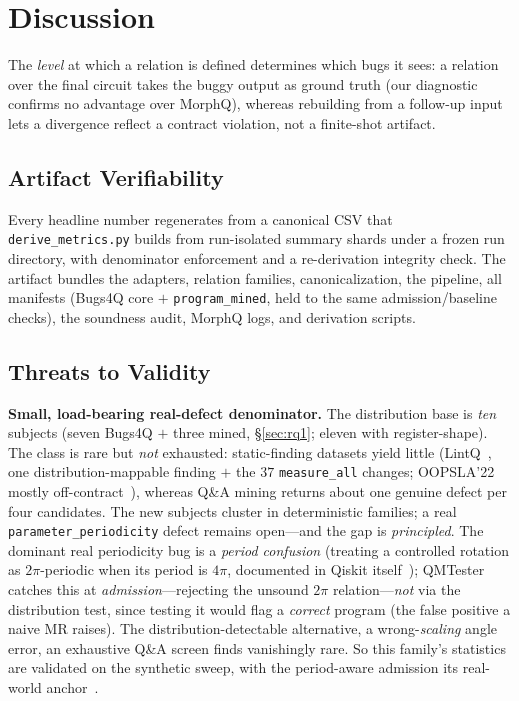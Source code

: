 \section{Discussion}
\label{sec:discussion}

The \emph{level} at which a relation is defined determines which bugs it sees: a relation over the final circuit takes the buggy output as ground truth (our diagnostic confirms no advantage over MorphQ), whereas rebuilding from a follow-up input lets a divergence reflect a contract violation, not a finite-shot artifact.

\subsection{Artifact Verifiability}
\label{sec:artifact-verifiability}

Every headline number regenerates from a canonical CSV that \texttt{derive\_metrics.py} builds from run-isolated summary shards under a frozen run directory, with denominator enforcement and a re-derivation integrity check. The artifact bundles the adapters, relation families, canonicalization, the pipeline, all manifests (Bugs4Q core $+$ \texttt{program\_mined}, held to the same admission/baseline checks), the soundness audit, MorphQ logs, and derivation scripts.

\subsection{Threats to Validity}
\label{sec:threats}

\textbf{Small, load-bearing real-defect denominator.} The distribution base is \emph{ten} subjects (seven Bugs4Q $+$ three mined, \S\ref{sec:rq1}; eleven with register-shape). The class is rare but \emph{not} exhausted: static-finding datasets yield little (LintQ~\cite{paltenghi2024lintq}, one distribution-mappable finding $+$ the $37$ \texttt{measure\_all} changes; OOPSLA'22 mostly off-contract~\cite{paltenghi2022bugs}), whereas Q\&A mining returns about one genuine defect per four candidates. The new subjects cluster in deterministic families; a real \texttt{parameter\_periodicity} defect remains open---and the gap is \emph{principled}. The dominant real periodicity bug is a \emph{period confusion} (treating a controlled rotation as $2\pi$-periodic when its period is $4\pi$, documented in Qiskit itself~\cite{qiskit13670}); QMTester catches this at \emph{admission}---rejecting the unsound $2\pi$ relation---\emph{not} via the distribution test, since testing it would flag a \emph{correct} program (the false positive a naive MR raises). The distribution-detectable alternative, a wrong-\emph{scaling} angle error, an exhaustive Q\&A screen finds vanishingly rare. So this family's statistics are validated on the synthetic sweep, with the period-aware admission its real-world anchor~\cite{qiskit13670}.

